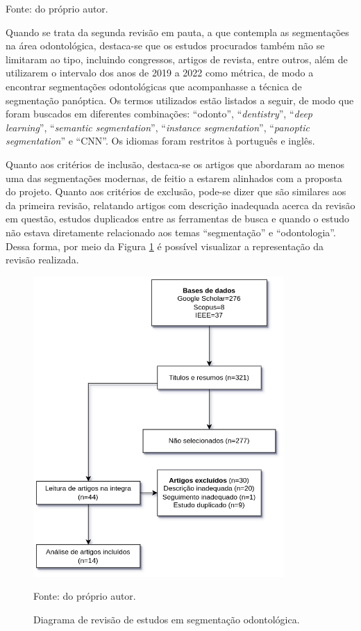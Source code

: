 \begin{table}[H]
    \vspace*{1 cm}
    Fonte: do próprio autor.
\end{table}

Quando se trata da segunda revisão em pauta, a que contempla as segmentações na área odontológica, destaca-se que os estudos procurados também não se limitaram ao tipo, incluindo congressos, artigos de revista, entre outros, além de utilizarem o intervalo dos anos de 2019 a 2022 como métrica, de modo a encontrar segmentações odontológicas que acompanhasse a técnica de segmentação panóptica. Os termos utilizados estão listados a seguir, de modo que foram buscados em diferentes combinações: ``odonto'', ``\textit{dentistry}'', ``\textit{deep learning}'', ``\textit{semantic segmentation}'', ``\textit{instance segmentation}'', ``\textit{panoptic segmentation}'' e ``CNN''. Os idiomas foram restritos à português e inglês.

Quanto aos critérios de inclusão, destaca-se os artigos que abordaram ao menos uma das segmentações modernas, de feitio a estarem alinhados com a proposta do projeto. Quanto aos critérios de exclusão, pode-se dizer que são similares aos da primeira revisão, relatando artigos com descrição inadequada acerca da revisão em questão, estudos duplicados entre as ferramentas de busca e quando o estudo não estava diretamente relacionado aos temas ``segmentação'' e ``odontologia''. Dessa forma, por meio da Figura \ref{proposal:revision:fig:2} é possível visualizar a representação da revisão realizada.

\begin{figure}[H]
    \centering
    \caption{Diagrama de revisão de estudos em segmentação odontológica.}
    \includegraphics[height=4.5in]{recursos/imagens/proposal/revisao_odonto.png}
    \label{proposal:revision:fig:2}

    \vspace*{1 cm}
    Fonte: do próprio autor.
\end{figure}

